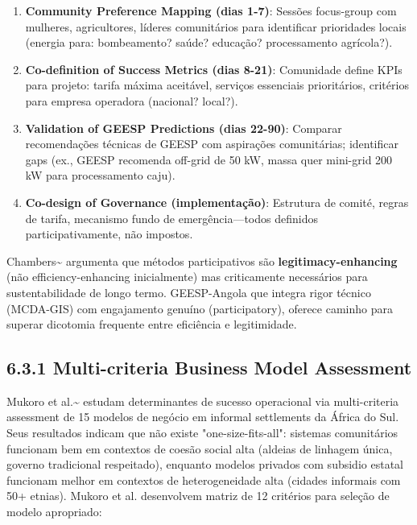 \documentclass[12pt, a4paper]{article}
\begin{document}
\begin{enumerate}
\item \textbf{Community Preference Mapping (dias 1-7)}: Sessões focus-group com mulheres, agricultores, líderes comunitários para identificar prioridades locais (energia para: bombeamento? saúde? educação? processamento agrícola?).
\item \textbf{Co-definition of Success Metrics (dias 8-21)}: Comunidade define KPIs para projeto: tarifa máxima aceitável, serviços essenciais prioritários, critérios para empresa operadora (nacional? local?).
\item \textbf{Validation of GEESP Predictions (dias 22-90)}: Comparar recomendações técnicas de GEESP com aspirações comunitárias; identificar gaps (ex., GEESP recomenda off-grid de 50 kW, massa quer mini-grid 200 kW para processamento caju).
\item \textbf{Co-design of Governance (implementação)}: Estrutura de comité, regras de tarifa, mecanismo fundo de emergência—todos definidos participativamente, não impostos.
\end{enumerate}

Chambers\textasciitilde{}\citep{Chambers2019} argumenta que métodos participativos são \textbf{legitimacy-enhancing} (não efficiency-enhancing inicialmente) mas criticamente necessários para sustentabilidade de longo termo. GEESP-Angola que integra rigor técnico (MCDA-GIS) com engajamento genuíno (participatory), oferece caminho para superar dicotomia frequente entre eficiência e legitimidade.

\subsection*{6.3.1 Multi-criteria Business Model Assessment}

Mukoro et al.\textasciitilde{}\citep{Mukoro2022} estudam determinantes de sucesso operacional via multi-criteria assessment de 15 modelos de negócio em informal settlements da África do Sul. Seus resultados indicam que não existe "one-size-fits-all": sistemas comunitários funcionam bem em contextos de coesão social alta (aldeias de linhagem única, governo tradicional respeitado), enquanto modelos privados com subsidio estatal funcionam melhor em contextos de heterogeneidade alta (cidades informais com 50+ etnias). Mukoro et al. desenvolvem matriz de 12 critérios para seleção de modelo apropriado:
\end{document}
